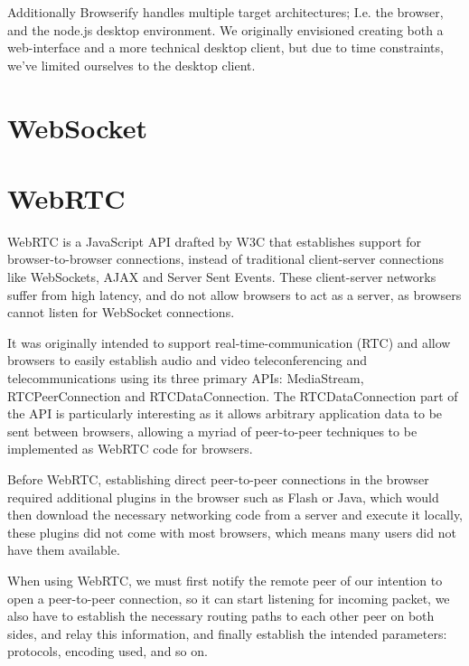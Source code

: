 Additionally Browserify handles multiple target architectures; I.e. the browser,
and the node.js desktop environment. We originally envisioned creating both a 
web-interface and a more technical desktop client, but due to time constraints,
we've limited ourselves to the desktop client.

\section{WebSocket}


\section{WebRTC}
WebRTC is a JavaScript \acs{API} drafted by W3C that establishes support for browser-to-browser connections,
instead of traditional client-server connections like WebSockets, AJAX and Server Sent Events.
These client-server networks suffer from high latency, and do not allow browsers to act as a server,
as browsers cannot listen for WebSocket connections.

It was originally intended to support real-time-communication (RTC) 
and allow browsers to easily establish audio and video teleconferencing and telecommunications
using its three primary \acs{API}s: MediaStream, RTCPeerConnection and RTCDataConnection.
The RTCDataConnection part of the \acs{API} is particularly interesting
as it allows arbitrary application data to be sent between browsers,
allowing a myriad of peer-to-peer techniques to be implemented as WebRTC code for browsers.

Before WebRTC, establishing direct peer-to-peer connections in the browser required
additional plugins in the browser such as Flash or Java, which would then download the necessary networking code
from a server and execute it locally,
these plugins did not come with most browsers,
which means many users did not have them available.
\newline

\label{webrtc-connection-server}
When using WebRTC, we must first notify the remote peer of our intention
to open a peer-to-peer connection, so it can start listening for incoming packet,
we also have to establish the necessary routing paths to each other peer on both sides,
and relay this information,
and finally establish the intended parameters: protocols, encoding used, and so on.

